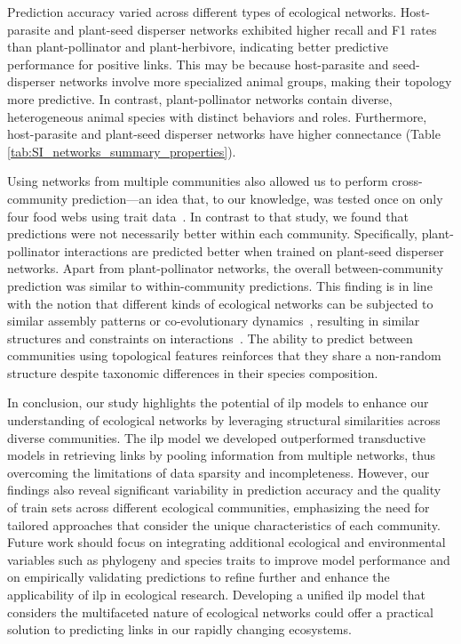 \documentclass[oneside, a4paper, onecolumn, 11pt]{article}
\begin{document}
\begin{refsection}
Prediction accuracy varied across different types of ecological networks. Host-parasite and plant-seed disperser networks exhibited higher recall and F1 rates than plant-pollinator and plant-herbivore, indicating better predictive performance for positive links. This may be because host-parasite and seed-disperser networks involve more specialized animal groups, making their topology more predictive. In contrast, plant-pollinator networks contain diverse, heterogeneous animal species with distinct behaviors and roles. Furthermore, host-parasite and plant-seed disperser networks have higher connectance (Table \ref{tab:SI_networks_summary_properties}). 

Using networks from multiple communities also allowed us to perform cross-community prediction---an idea that, to our knowledge, was tested once on only four food webs using trait data~\autocite{Caron2024-jf}. In contrast to that study, we found that predictions were not necessarily better within each community. Specifically, plant-pollinator interactions are predicted better when trained on plant-seed disperser networks. Apart from plant-pollinator networks, the overall between-community prediction was similar to within-community predictions. This finding is in line with the notion that different kinds of ecological networks can be subjected to similar assembly patterns or co-evolutionary dynamics~\autocite{Ponisio2017-ii}, resulting in similar structures and constraints on interactions~\autocite{Michalska-Smith2019-ap}. The ability to predict between communities using topological features reinforces that they share a non-random structure despite taxonomic differences in their species composition. 

In conclusion, our study highlights the potential of \ac{ilp} models to enhance our understanding of ecological networks by leveraging structural similarities across diverse communities. The \ac{ilp} model we developed outperformed transductive models in retrieving links by pooling information from multiple networks, thus overcoming the limitations of data sparsity and incompleteness. However, our findings also reveal significant variability in prediction accuracy and the quality of train sets across different ecological communities, emphasizing the need for tailored approaches that consider the unique characteristics of each community. Future work should focus on integrating additional ecological and environmental variables such as phylogeny and species traits to improve model performance and on empirically validating predictions to refine further and enhance the applicability of \ac{ilp} in ecological research. Developing a unified \ac{ilp} model that considers the multifaceted nature of ecological networks could offer a practical solution to predicting links in our rapidly changing ecosystems.



\end{refsection}
\end{document}
